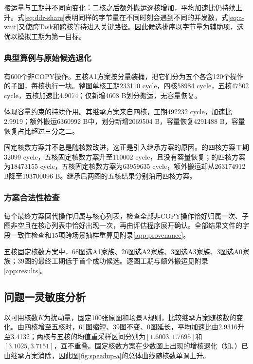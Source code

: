 搬运量与工期并不同向变化：二核之后额外搬运逐核增加，平均加速比仍持续上升。式\eqref{eq:ddr-share}表明同样的字节量在不同时刻会遇到不同的并发数，式\eqref{eq:a-wait}又使跨Task和跨核等待进入关键路径。因此候选排序以字节量为辅助项，选优以模拟工期为第一目标。

\subsubsection{典型算例与原始候选退化}
有600个非COPY操作。五核A1方案按分量装桶，把它们分为五个各含120个操作的子图，每核执行一块。整图单核工期233110 cycle，四核58984 cycle，五核47502 cycle，五核加速比4.9074；仅新增4608 B划分搬运，无容量恢复。

体现容量约束的持续作用。其继承方案来自四核，工期492232 cycle，加速比2.9919；额外搬运6360992 B中，划分新增2069504 B，容量恢复4291488 B，容量恢复占比超过三分之二。

固定核数方案并不总是随核数改进，这正是引入继承方案的原因。的四核方案工期32099 cycle，五核固定核数方案升至110002 cycle，且没有容量恢复；的四核方案为18473155 cycle，五核固定核数方案为63959635 cycle，额外搬运却从263174912 B降至193700096 B。继承后两图的五核结果分别沿用四核方案。

\subsubsection{方案合法性检查}
每个最终方案回代操作归属与核心列表，检查全部非COPY操作恰好归属一次、子图非空且在核心列表中恰好出现一次，再由评估程序展开确认。全部结果文件的字段一致性检查和15项跨场景抽样重算见附录\ref{app:provenance}。

五核固定核数方案中，68图选A1家族、26图选A2家族、3图选A3家族、3图选A0家族；39图的最终工期低于首个成功候选。逐图工期与额外搬运见附录\ref{app:results}。

\subsection{问题一灵敏度分析}
以可用核数$K$为扰动量，固定100张原图和场景A规则，比较继承方案随核数的变化。由四核增至五核时，61图缩短、39图不变、0图延长，平均加速比由2.9316升至3.4132；两核与五核的均值重采样区间分别为$[1.6003,1.7695]$和$[3.1025,3.7151]$，互不重叠。固定核数方案在少数图上出现的增核退化（如、）已由继承方案消除，因此图\ref{fig:speedup-a}的总体曲线随核数单调上升。
